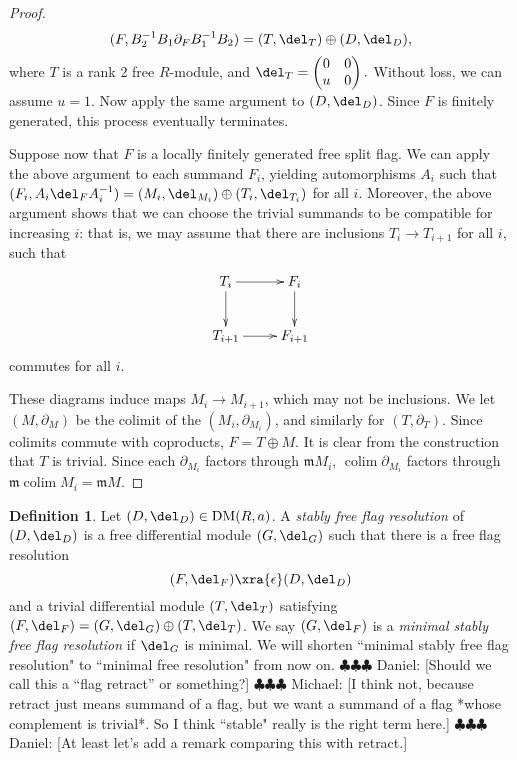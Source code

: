 \documentclass[12pt]{amsart}
\theoremstyle{definition}
\newtheorem{defn}[lemma]{Definition}
\theoremstyle{remark}
\newcommand{\daniel}[1]{{\color{blue} \sf $\clubsuit\clubsuit\clubsuit$ Daniel: [#1]}}
\newcommand{\michael}[1]{{\color{red} \sf $\clubsuit\clubsuit\clubsuit$ Michael: [#1]}}
\def\on{\operatorname}
\def\DM{\operatorname{DM}}
\begin{document}
\begin{proof}
$$
(F, B_2^{-1}B_1\partial_F B_1^{-1}B_2) = (T, \del_T) \oplus (D, \del_D),
$$
where $T$ is a rank 2 free $R$-module, and $\del_T = \begin{pmatrix} 0&0\\u&0 \end{pmatrix}.$ Without loss, we can assume $u = 1$. Now apply the same argument to $(D, \del_D)$. Since $F$ is finitely generated, this process eventually terminates.  

Suppose now that $F$ is a locally finitely generated free split flag. We can apply the above argument to each summand $F_i$, yielding automorphisms $A_i$ such that $(F_i, A_i \del_F A_i^{-1}) = (M_i, \del_{M_i}) \oplus (T_i, \del_{T_i})$ for all $i$. Moreover, the above argument shows that we can choose the trivial summands to be compatible for increasing $i$: that is, we may assume that there are inclusions $T_i \to T_{i+1}$ for all $i$, such that
\[
\xymatrix{
T_i \ar[r]\ar[d]&F_i\ar[d]\\
T_{i+1}\ar[r]&F_{i+1}
}
\]
commutes for all $i$. 
\iffalse
It follows that the diagram
\[
\xymatrix{
T_i \ar[d]&\ar[l]F_i\ar[d]\\
T_{i+1}&\ar[l]F_{i+1},
}
\]
where the horizontal maps are the projections, also commutes. 
\fi
These diagrams induce maps $M_{i}\to M_{i+1}$, which may not be inclusions.  We let $(M,\partial_M)$ be the colimit of the $(M_i,\partial_{M_i})$, and similarly for $(T,\partial_T)$.  Since colimits commute with coproducts, $F=T \oplus M$.  It is clear from the construction that $T$ is trivial. Since each $\partial_{M_i}$ factors through $\mathfrak mM_i$, $\on{colim} \partial_{M_i}$ factors through $\mathfrak m \on{colim} M_i=\mathfrak m M$.  
\end{proof}


\begin{defn}
Let $(D, \del_D) \in \DM(R, a)$. A \emph{stably free flag resolution} of $(D, \del_D)$ is a free differential module $(G, \del_G)$ such that there is a free flag resolution
$$
(F, \del_F) \xra{\epsilon} (D,\del_D)
$$
and a trivial differential module $(T, \del_T)$ satisfying $(F, \del_F) = (G, \del_G) \oplus (T, \del_T)$. We say $(G, \del_F)$ is a \emph{minimal stably free flag resolution} if $\del_G$ is minimal. We will shorten ``minimal stably free flag resolution" to ``minimal free resolution" from now on.
\daniel{Should we call this a ``flag retract'' or something?}\michael{I think not, because retract just means summand of a flag, but we want a summand of a flag *whose complement is trivial*. So I think ``stable" really is the right term here.}
\daniel{At least let's add a remark comparing this with retract.}
\end{defn}
\end{document}
